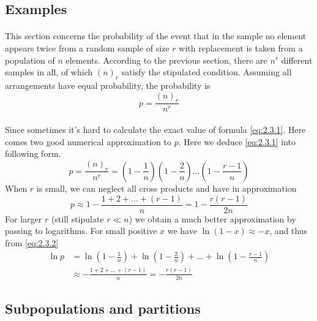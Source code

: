 \documentclass{article}
\numberwithin{equation}{subsection}
\begin{document}
		\subsection{Examples}
			\paragraph{} This section concerns the probability of the event that in the sample no element appears twice from a random sample of size $r$ with replacement is taken from a population of $n$ elements. According to the previous section, there are $n^r$ different samples in all, of which $(n)_r$ satisfy the stipulated condition. Assuming all arrangements have equal probability, the probability is 
			\begin{equation}
				\label{eq:2.3.1}
				p = \frac{(n)_r}{n^r}
			\end{equation}
			\paragraph{} Since sometimes it's hard to calculate the exact value of formula \eqref{eq:2.3.1}. Here comes two good numerical approximation to $p$. Here we deduce \eqref{eq:2.3.1} into following form.
			\begin{equation}
				\label{eq:2.3.2}
				p = \frac{(n)_r}{n^r} = \left(1-\frac{1}{n}\right)\left(1-\frac{2}{n}\right)\dots\left(1-\frac{r-1}{n}\right)
			\end{equation} 
			When $r$ is small, we can neglect all cross products and have in approximation
			\begin{equation}
				\label{eq:2.3.3}
				p \approx 1-\frac{1+2+\dots+(r-1)}{n} = 1-\frac{r(r-1)}{2n}
			\end{equation}
			For larger $r$ (still stipulate $r\ll n$) we obtain a much better approximation by passing to logarithms. For small positive $x$ we have $\ln(1-x)\approx-x$, and thus from \eqref{eq:2.3.2}
			\begin{equation}
				\label{eq:2.3.4}
				\begin{aligned}
					\ln p &= \ln \left(1-\frac{1}{n}\right)+\ln \left(1-\frac{2}{n}\right)+\dots+\ln \left(1-\frac{r-1}{n}\right)\\ &\approx-\frac{1+2+\dots+(r-1)}{n} = -\frac{r(r-1)}{2n}
				\end{aligned}			
			\end{equation}
		\subsection{Subpopulations and partitions}
\end{document}
